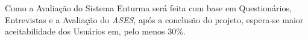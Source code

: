 
	Como a Avaliação do Sistema Enturma será feita com base em Questionários, Entrevistas e a Avaliação do \textit{ASES}, após a conclusão do projeto, espera-se maior aceitabilidade dos Usuários em, pelo menos 30\%.
